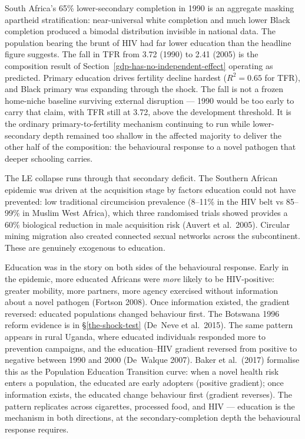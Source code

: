 \documentclass[12pt,letterpaper]{article}
\begin{document}
{South Africa's 65\% lower-secondary completion in 1990 is an aggregate
masking apartheid stratification: near-universal white completion and
much lower Black completion produced a bimodal distribution invisible
in national data. The population bearing the brunt of HIV had far
lower education than the headline figure suggests. The fall in TFR
from 3.72 (1990) to 2.41 (2005) is the composition result of
Section~\ref{gdp-has-no-independent-effect} operating as predicted.
Primary education drives fertility decline hardest ($R^2=0.65$ for
TFR), and Black primary was expanding through the shock. The fall is
not a frozen home-niche baseline surviving external disruption --- 1990 would
be too early to carry that claim, with TFR still at 3.72, above the
development threshold. It is the ordinary primary-to-fertility
mechanism continuing to run while lower-secondary depth remained too
shallow in the affected majority to deliver the other half of the
composition: the behavioural response to a novel pathogen that deeper
schooling carries.

The LE collapse runs through that secondary deficit. The Southern
African epidemic was driven at the acquisition stage by factors
education could not have prevented: low traditional circumcision
prevalence (8--11\% in the HIV belt vs 85--99\% in Muslim West
Africa), which three randomised trials showed provides a 60\%
biological reduction in male acquisition risk (Auvert et al.~2005).
Circular mining migration also created connected sexual networks
across the subcontinent. These are genuinely exogenous to education.

Education was in the story on both sides of the behavioural response.
Early in the epidemic, more educated Africans were \emph{more} likely
to be HIV-positive: greater mobility, more partners, more agency
exercised without information about a novel pathogen (Fortson 2008).
Once information existed, the gradient reversed: educated populations
changed behaviour first. The Botswana 1996 reform evidence is in
\S\ref{the-shock-test} (De~Neve et al.~2015). The same pattern
appears in rural Uganda, where educated individuals responded more
to prevention campaigns, and the
education--HIV gradient reversed from positive to negative between
1990 and 2000 (De~Walque 2007). Baker et al.\ (2017) formalise this
as the Population Education Transition curve: when a novel health risk
enters a population, the educated are early adopters (positive
gradient); once information exists, the educated change behaviour
first (gradient reverses). The pattern replicates across cigarettes,
processed food, and HIV --- education is the mechanism in both
directions, at the secondary-completion depth the behavioural response
requires.

}
\end{document}

